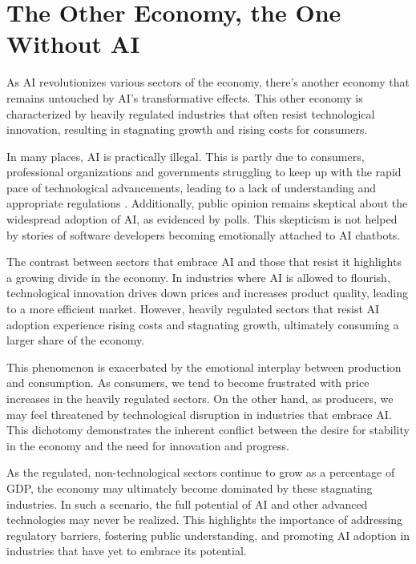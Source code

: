 \section{The Other Economy, the One Without AI}

As AI revolutionizes various sectors of the economy, there's another economy that remains untouched by AI's transformative effects. This other economy is characterized by heavily regulated industries that often resist technological innovation, resulting in stagnating growth and rising costs for consumers.

In many places, AI is practically illegal. This is partly due to consumers, professional organizations and governments struggling to keep up with the rapid pace of technological advancements, leading to a lack of understanding and appropriate regulations . Additionally, public opinion remains skeptical about the widespread adoption of AI, as evidenced by polls. This skepticism is not helped by stories of software developers becoming emotionally attached to AI chatbots.

The contrast between sectors that embrace AI and those that resist it highlights a growing divide in the economy. In industries where AI is allowed to flourish, technological innovation drives down prices and increases product quality, leading to a more efficient market. However, heavily regulated sectors that resist AI adoption experience rising costs and stagnating growth, ultimately consuming a larger share of the economy.

This phenomenon is exacerbated by the emotional interplay between production and consumption. As consumers, we tend to become frustrated with price increases in the heavily regulated sectors. On the other hand, as producers, we may feel threatened by technological disruption in industries that embrace AI. This dichotomy demonstrates the inherent conflict between the desire for stability in the economy and the need for innovation and progress.

As the regulated, non-technological sectors continue to grow as a percentage of GDP, the economy may ultimately become dominated by these stagnating industries. In such a scenario, the full potential of AI and other advanced technologies may never be realized. This highlights the importance of addressing regulatory barriers, fostering public understanding, and promoting AI adoption in industries that have yet to embrace its potential.

